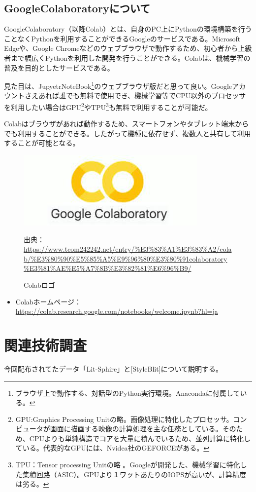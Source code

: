 \documentclass[dvipdfmx]{jsarticle}
\begin{document}
\subsection{GoogleColaboratoryについて}
GoogleColaboratory（以降Colab）とは、自身のPC上にPythonの環境構築を行うことなくPythonを利用することができるGoogleのサービスである。Microsoft Edgeや、Google Chromeなどのウェブブラウザで動作するため、初心者から上級者まで幅広くPythonを利用した開発を行うことができる。Colabは、機械学習の普及を目的としたサービスである。\par 見た目は、JupyetrNoteBook\footnote{ブラウザ上で動作する、対話型のPython実行環境。Anacondaに付属している。}のウェブブラウザ版だと思って良い。Googleアカウントさえあれば誰でも無料で使用でき、機械学習等でCPU以外のプロセッサを利用したい場合はGPU\footnote{GPU:Graphics Processing Unitの略。画像処理に特化したプロセッサ。コンピュータが画面に描画する映像の計算処理を主な任務としている。そのため、CPUよりも単純構造でコアを大量に積んでいるため、並列計算に特化している。代表的なGPUには、Nvidea社のGEFORCEがある。}やTPU\footnote{TPU：Tensor processing Unitの略
。Googleが開発した、機械学習に特化した集積回路（ASIC）。GPUより１ワットあたりのIOPSが高いが、計算精度は劣る。}も無料で利用することが可能だ。\par
Colabはブラウザがあれば動作するため、スマートフォンやタブレット端末からでも利用することができる。したがって機種に依存せず、複数人と共有して利用することが可能となる。
\begin{figure}[H]
  \centering
  \includegraphics[scale=0.4]{images/colab_logo.jpeg}
  \caption{Colabロゴ}
  出典：\url{https://www.tcom242242.net/entry/%E3%83%A1%E3%83%A2/colab/%E3%80%90%E5%85%A5%E9%96%80%E3%80%91colaboratory%E3%81%AE%E5%A7%8B%E3%82%81%E6%96%B9/}
\end{figure}
\begin{itemize}
  \item Colabホームページ：\url{https://colab.research.google.com/notebooks/welcome.ipynb?hl=ja}
\end{itemize}
\section{関連技術調査}
今回配布されてたデータ「Lit-Sphire」と[StyleBlit]について説明する。
\end{document}

